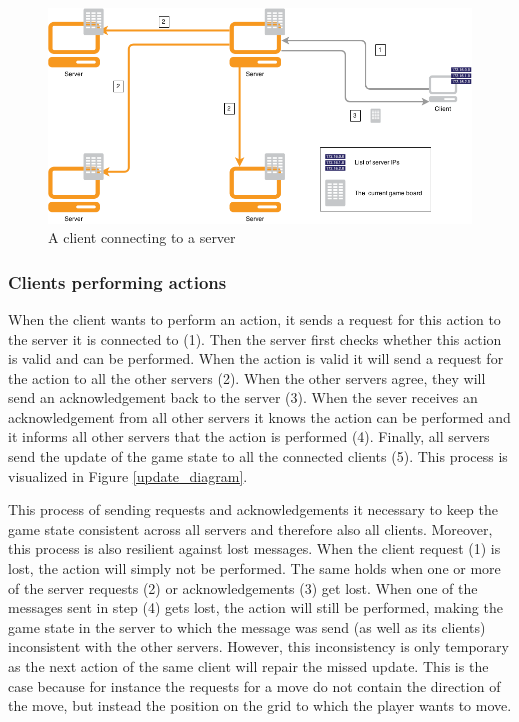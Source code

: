 \begin{figure}[h!]
  \centering
    \includegraphics[width=\textwidth]{diagrams/connecting-client}
    
  \caption{A client connecting to a server}
  \label{connect_diagram}
\end{figure}

\subsubsection*{Clients performing actions}
When the client wants to perform an action, it sends a request for this action to the server it is connected to (1). Then the server first checks whether this action is valid and can be performed. When the action is valid it will send a request for the action to all the other servers (2). When the other servers agree, they will send an acknowledgement back to the server (3). When the sever receives an acknowledgement from all other servers it knows the action can be performed and it informs all other servers that the action is performed (4). Finally, all servers send the update of the game state to all the connected clients (5). This process is visualized in Figure \ref{update_diagram}.

This process of sending requests and acknowledgements it necessary to keep the game state consistent across all servers and therefore also all clients. Moreover, this process is also resilient against lost messages. When the client request (1) is lost, the action will simply not be performed. The same holds when one or more of the server requests (2) or acknowledgements (3) get lost. When one of the messages sent in step (4) gets lost, the action will still be performed, making the game state in the server to which the message was send (as well as its clients) inconsistent with the other servers. However, this inconsistency is only temporary as the next action of the same client will repair the missed update. This is the case because for instance the requests for a move do not contain the direction of the move, but instead the position on the grid to which the player wants to move.

